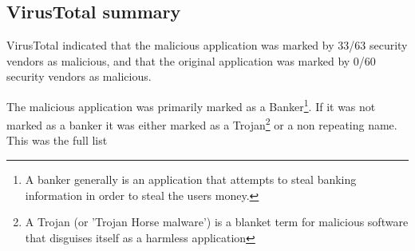 \subsection{VirusTotal summary}

VirusTotal indicated that the malicious application was marked by 33/63 security vendors as malicious, 
and that the original application was marked by 0/60 security vendors as malicious.

The malicious application was primarily marked as a Banker\footnote{A banker generally is an application that attempts to steal banking information in order to steal the users money.}. 
If it was not marked as a banker it was either marked as a Trojan\footnote{A Trojan (or 'Trojan Horse malware') is a blanket term for malicious software that disguises itself as a harmless application} or a non repeating name.
This was the full list


